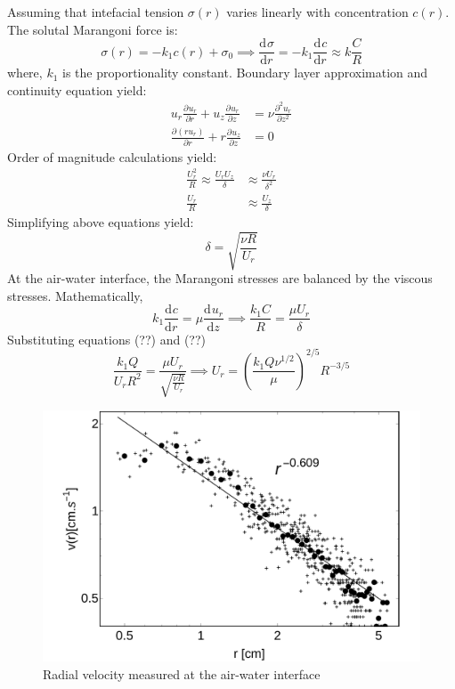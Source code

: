 \documentclass[aps, twocolumn, floatfix, superscriptaddress]{revtex4}
\newcommand{\tdc}[3][]{\frac{\mathrm{d}^{#1}#2}{\mathrm{d}#3^{#1}}} %
\newcommand{\pdc}[3][]{\frac{\partial^{#1} #2}{\partial #3^{#1}}} %
\begin{document}
Assuming that intefacial tension $\sigma (r)$ varies linearly with concentration $c(r)$. The solutal Marangoni force is:
\begin{equation}
\sigma (r) = -k_{1} c(r) + \sigma_{0} \implies \tdc{\sigma}{r} = -k_{1}\tdc{c}{r}  \approx k \frac{C}{R}
\end{equation}
where, $k_{1}$ is the proportionality constant. 
Boundary layer approximation and continuity equation yield: 
\begin{align}
u_{r}\pdc{u_{r}}{r} + u_{z}\pdc{u_{r}}{z} &= \nu \pdc[2]{u_{r}}{z} \\
\pdc{(ru_{r})}{r} + r\pdc{u_{z}}{z} &= 0
\end{align}
Order of magnitude calculations yield:
\begin{align}
\frac{U_{r}^{2}}{R} \approx \frac{U_{r}U_{z}}{\delta} &\approx \frac{\nu U_{r}}{\delta^{2}} \\ 
\frac{U_{r}}{R} &\approx \frac{U_{z}}{\delta} 
\end{align}
Simplifying above equations yield:
\begin{equation}
\delta = \sqrt{\frac{\nu R}{U_{r}}}
\end{equation}
At the air-water interface, the Marangoni stresses are balanced by the viscous stresses. Mathematically,
\begin{equation}
k_{1}\tdc{c}{r} = \mu \tdc{u_{r}}{z} \implies \frac{k_{1}C}{R} = \frac{\mu U_{r}}{\delta}
\end{equation}
Substituting equations (??) and (??) 
\begin{equation}
\frac{k_{1}Q}{U_{r}R^{2}} = \frac{\mu U_{r}}{\sqrt{\frac{\nu R}{U_{r}}}} \implies
\boxed{U_{r} = \left(\frac{k_{1}Q\nu^{1/2}}{\mu}\right)^{2/5} R^{-3/5}}
\end{equation}
\begin{figure}[ht] 
    \begin{center}
       \includegraphics[scale=0.25]{figure5.pdf}
    \end{center}
    \caption{Radial velocity measured at the air-water interface}
    \label{fig:radvel}
\end{figure}
\end{document}
